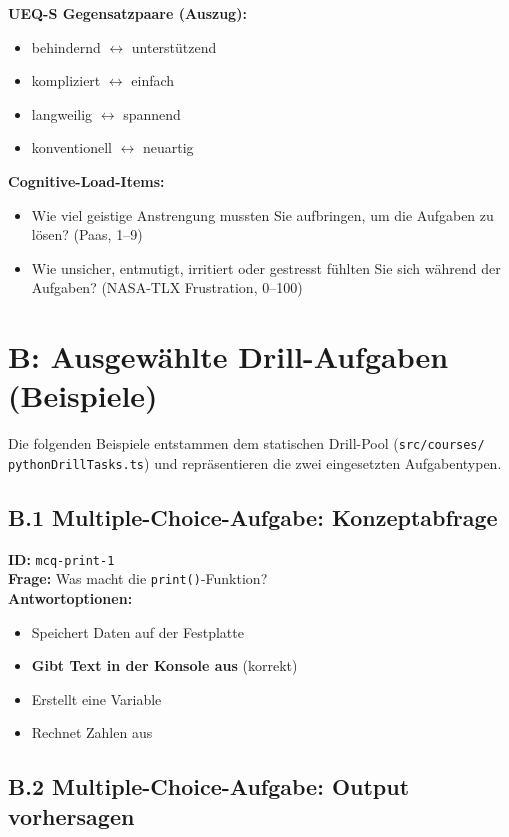 \textbf{UEQ-S Gegensatzpaare (Auszug):}
\begin{itemize}
    \item behindernd $\leftrightarrow$ unterstützend
    \item kompliziert $\leftrightarrow$ einfach
    \item langweilig $\leftrightarrow$ spannend
    \item konventionell $\leftrightarrow$ neuartig
\end{itemize}

\textbf{Cognitive-Load-Items:}
\begin{itemize}
    \item Wie viel geistige Anstrengung mussten Sie aufbringen, um die Aufgaben zu lösen? (Paas, 1--9)
    \item Wie unsicher, entmutigt, irritiert oder gestresst fühlten Sie sich während der Aufgaben? (NASA-TLX Frustration, 0--100)
\end{itemize}

\section*{B: Ausgewählte Drill-Aufgaben (Beispiele)}

Die folgenden Beispiele entstammen dem statischen Drill-Pool (\texttt{src/courses/\\pythonDrillTasks.ts}) und repräsentieren die zwei eingesetzten Aufgabentypen.

\subsection*{B.1 Multiple-Choice-Aufgabe: Konzeptabfrage}

\textbf{ID:} \texttt{mcq-print-1} \\
\textbf{Frage:} Was macht die \texttt{print()}-Funktion? \\
\textbf{Antwortoptionen:}
\begin{itemize}
    \item Speichert Daten auf der Festplatte
    \item \textbf{Gibt Text in der Konsole aus} \textrm{(korrekt)}
    \item Erstellt eine Variable
    \item Rechnet Zahlen aus
\end{itemize}

\subsection*{B.2 Multiple-Choice-Aufgabe: Output vorhersagen}

